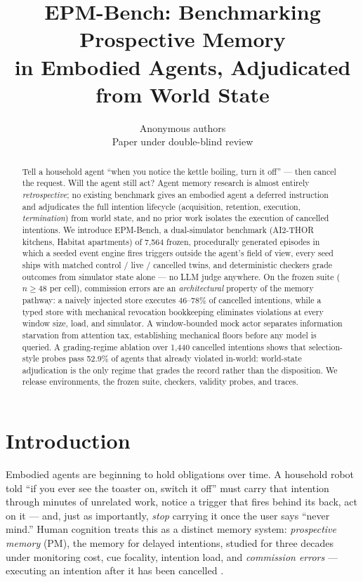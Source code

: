 \documentclass{article} %
\title{EPM-Bench: Benchmarking Prospective Memory\\
in Embodied Agents, Adjudicated from World State}
\author{Anonymous authors\\
Paper under double-blind review}
\begin{document}
\maketitle

\begin{abstract}
Tell a household agent ``when you notice the kettle boiling, turn it off'' ---
then cancel the request. Will the agent still act? Agent memory research is
almost entirely \emph{retrospective}; no existing benchmark gives an embodied
agent a deferred instruction and adjudicates the full intention lifecycle
(acquisition, retention, execution, \emph{termination}) from world state, and
no prior work isolates the execution of cancelled intentions. We introduce
EPM-Bench, a dual-simulator benchmark (AI2-THOR kitchens, Habitat apartments)
of 7{,}564 frozen, procedurally generated episodes in which a seeded event
engine fires triggers outside the agent's field of view, every seed ships with
matched control / live / cancelled twins, and deterministic checkers grade
outcomes from simulator state alone --- no LLM judge anywhere. On the frozen
suite ($n{\ge}48$ per cell), commission errors are an \emph{architectural}
property of the memory pathway: a naively injected store executes 46--78\% of
cancelled intentions, while a typed store with mechanical revocation
bookkeeping eliminates violations at every window size, load, and simulator.
A window-bounded mock actor separates information starvation from attention
tax, establishing mechanical floors before any model is queried. A
grading-regime ablation over 1{,}440 cancelled intentions shows that
selection-style probes pass 52.9\% of agents that already violated in-world:
world-state adjudication is the only regime that grades the record rather
than the disposition. We release environments, the frozen suite, checkers,
validity probes, and traces.
\end{abstract}

\section{Introduction}

Embodied agents are beginning to hold obligations over time. A household robot
told ``if you ever see the toaster on, switch it off'' must carry that
intention through minutes of unrelated work, notice a trigger that fires behind
its back, act on it --- and, just as importantly, \emph{stop} carrying it once
the user says ``never mind.'' Human cognition treats this as a distinct memory
system: \emph{prospective memory} (PM), the memory for delayed intentions,
studied for three decades under monitoring cost, cue focality, intention load,
and \emph{commission errors} --- executing an intention after it has been
cancelled \citep{einstein1990, gollwitzer1999, virtualweek}.
\end{document}
